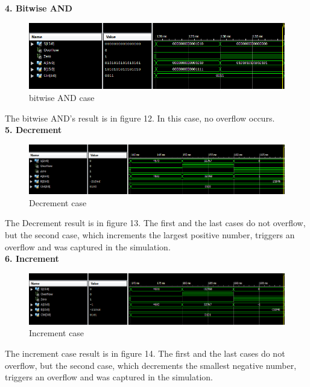 \documentclass{article}
\begin{document}
\textbf{4. Bitwise AND}\\
\begin{figure}[!htb]
  \centering
  \includegraphics[width=\linewidth]{0011.PNG}
  \caption{bitwise AND case}
  \label{fig:AND}
\end{figure}
The bitwise AND's result is in figure 12. In this case, no overflow occurs.\\

\textbf{5. Decrement}\\
\begin{figure}[!htb]
  \centering
  \includegraphics[width=\linewidth]{0100.PNG}
  \caption{Decrement case}
  \label{fig:Decrement}
\end{figure}
The Decrement result is in figure 13. The first and the last cases do not overflow, but the second case, which increments the largest positive number, triggers an overflow and was captured in the simulation. \\

\textbf{6. Increment}\\
\begin{figure}[!htb]
  \centering
  \includegraphics[width=\linewidth]{0101.PNG}
  \caption{Increment case}
  \label{fig:Increment}
\end{figure}
The increment case result is in figure 14. The first and the last cases do not overflow, but the second case, which decrements the smallest negative number, triggers an overflow and was captured in the simulation. \\
\end{document}
